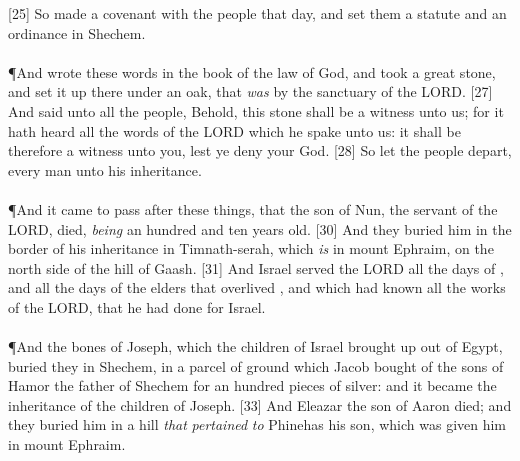 [25] \textcolor[cmyk]{0.99998,1,0,0}{So  made a covenant with the people that day, and set them a statute and an ordinance in Shechem.}\\
\\
\P \textcolor[cmyk]{0.99998,1,0,0}{And  wrote these words in the book of the law of God, and took a great stone, and set it up there under an oak, that \emph{was} by the sanctuary of the LORD.}
[27] \textcolor[cmyk]{0.99998,1,0,0}{And  said unto all the people, Behold, this stone shall be a witness unto us; for it hath heard all the words of the LORD which he spake unto us: it shall be therefore a witness unto you, lest ye deny your God.}
[28] \textcolor[cmyk]{0.99998,1,0,0}{So  let the people depart, every man unto his inheritance.}\\
\\
\P \textcolor[cmyk]{0.99998,1,0,0}{And it came to pass after these things, that  the son of Nun, the servant of the LORD, died, \emph{being} an hundred and ten years old.}
[30] \textcolor[cmyk]{0.99998,1,0,0}{And they buried him in the border of his inheritance in Timnath-serah, which \emph{is} in mount Ephraim, on the north side of the hill of Gaash.}
[31] \textcolor[cmyk]{0.99998,1,0,0}{And Israel served the LORD all the days of , and all the days of the elders that overlived , and which had known all the works of the LORD, that he had done for Israel.}\\
\\
\P \textcolor[cmyk]{0.99998,1,0,0}{And the bones of Joseph, which the children of Israel brought up out of Egypt, buried they in Shechem, in a parcel of ground which Jacob bought of the sons of Hamor the father of Shechem for an hundred pieces of silver: and it became the inheritance of the children of Joseph.}
[33] \textcolor[cmyk]{0.99998,1,0,0}{And Eleazar the son of Aaron died; and they buried him in a hill \emph{that} \emph{pertained} \emph{to} Phinehas his son, which was given him in mount Ephraim.}

